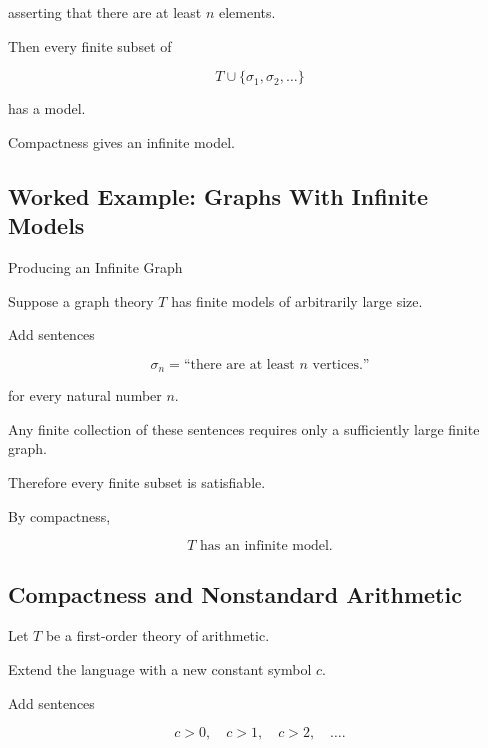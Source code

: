 asserting that there are at least \(n\) elements.

Then every finite subset of

\[
T
\cup
\{
\sigma_1,\sigma_2,\ldots
\}
\]

has a model.

Compactness gives an infinite model.

\subsection{Worked Example: Graphs With Infinite Models}
\label{subsec:worked-compactness-graph}

\begin{workedexamplebox}{Producing an Infinite Graph}

Suppose a graph theory \(T\) has finite models of arbitrarily large size.

Add sentences

\[
\sigma_n
=
\text{``there are at least \(n\) vertices.''}
\]

for every natural number \(n\).

Any finite collection of these sentences requires only a sufficiently large
finite graph.

Therefore every finite subset is satisfiable.

By compactness,

\begin{answerbox}
\[
\boxed{
T
\text{ has an infinite model.}
}
\]
\end{answerbox}

\end{workedexamplebox}

\subsection{Compactness and Nonstandard Arithmetic}
\label{subsec:compactness-nonstandard-arithmetic}

Let \(T\) be a first-order theory of arithmetic.

Extend the language with a new constant symbol \(c\).

Add sentences

\[
\boxed{
c>0,
\quad
c>1,
\quad
c>2,
\quad
\ldots.
}
\]


